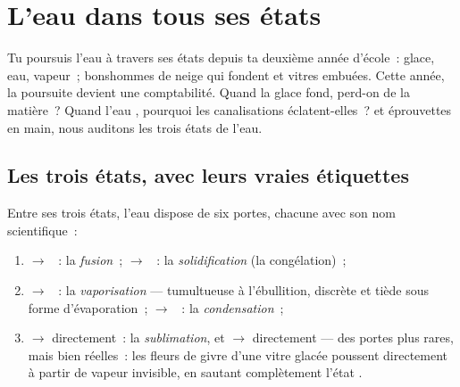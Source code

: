 \chapter{L'eau dans tous ses états}\label{ch:g6:water-states}

Tu poursuis l'eau à travers ses états depuis ta deuxième année
d'école~: glace, eau, vapeur~; bonshommes de neige qui fondent et
vitres embuées. Cette année, la poursuite devient une comptabilité.
Quand la glace fond, perd-on de la matière~? Quand l'eau ,
pourquoi les canalisations éclatent-elles~?  et éprouvettes
en main, nous auditons les trois états de l'eau.

\section{Les trois états, avec leurs vraies étiquettes}

\begin{definition}\label{def:g6:water-states:changes}
Entre ses trois états, l'eau dispose de six portes, chacune avec son
nom scientifique~:
\begin{enumerate}
  \item {} $\to$ ~: la \emph{fusion}~;
         $\to$ ~: la
        \emph{solidification} (la
        congélation)~;
  \item {} $\to$ ~: la
        \emph{vaporisation} --- tumultueuse à
        l'ébullition, discrète et tiède sous forme d'évaporation~;
         $\to$ ~: la
        \emph{condensation}~;
  \item {} $\to$  directement~: la
        \emph{sublimation}, et  $\to$ 
        directement --- des portes plus rares, mais bien réelles~:
        les fleurs de givre d'une vitre glacée poussent directement
        à partir de vapeur invisible, en sautant complètement l'état
        .
\end{enumerate}
\end{definition}

